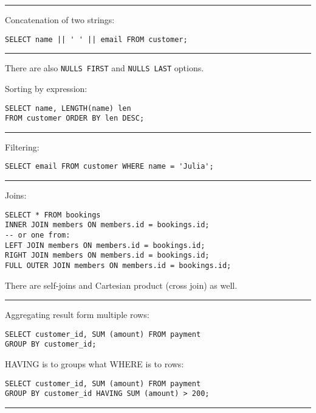 \documentclass{charun}
\begin{document}
\begin{multicols*}{2}
\hrule

Concatenation of two strings:
\begin{verbatim}
SELECT name || ' ' || email FROM customer;
\end{verbatim}

\hrule

There are also \texttt{NULLS FIRST} and \texttt{NULLS LAST} options.

Sorting by expression:
\begin{verbatim}
SELECT name, LENGTH(name) len
FROM customer ORDER BY len DESC;
\end{verbatim}

\hrule

Filtering:
\begin{verbatim}
SELECT email FROM customer WHERE name = 'Julia';
\end{verbatim}

\hrule

Joins:
\begin{verbatim}
SELECT * FROM bookings
INNER JOIN members ON members.id = bookings.id;
-- or one from:
LEFT JOIN members ON members.id = bookings.id;
RIGHT JOIN members ON members.id = bookings.id;
FULL OUTER JOIN members ON members.id = bookings.id;
\end{verbatim}

There are self-joins and Cartesian product (cross join) as well.

\hrule

Aggregating result form multiple rows:
\begin{verbatim}
SELECT customer_id, SUM (amount) FROM payment
GROUP BY customer_id;
\end{verbatim}

HAVING is to groups what WHERE is to rows:
\begin{verbatim}
SELECT customer_id, SUM (amount) FROM payment
GROUP BY customer_id HAVING SUM (amount) > 200;
\end{verbatim}

\hrule

\end{multicols*}
\end{document}
